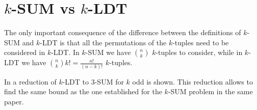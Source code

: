 \section{$k$-SUM vs $k$-LDT}

The only important consequence of the difference between the definitions of
$k$-SUM and $k$-LDT is that all the permutations of the $k$-tuples need to be
considered in $k$-LDT. In $k$-SUM we have $\binom{n}{k}$ $k$-tuples to consider,
while in $k$-LDT we have $\binom{n}{k} k! = \frac{n!}{(n-k)!}$ $k$-tuples.

In \cite{gronlund:2014} a reduction of $k$-LDT to $3$-SUM for $k$ odd is shown.
This reduction allows to find the same 
bound as the one established for the $k$-SUM problem in the same paper.

